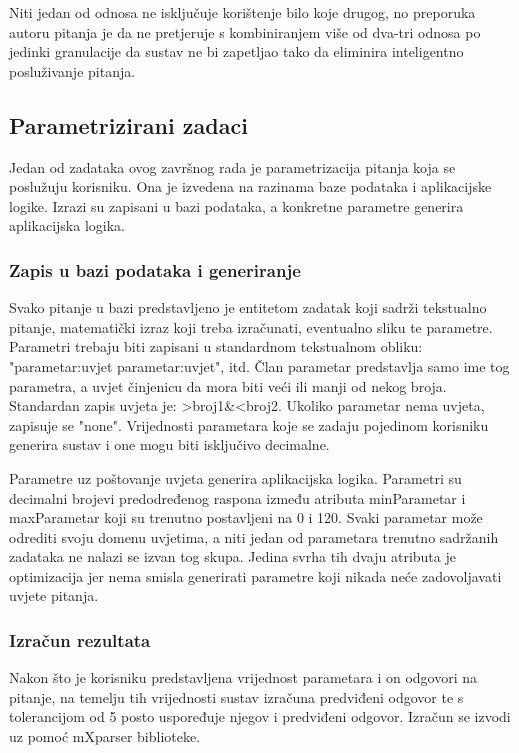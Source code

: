 \documentclass[times, utf8, zavrsni, numeric]{fer}
\begin{document}
Niti jedan od odnosa ne isključuje korištenje bilo koje drugog, no preporuka autoru pitanja je da ne pretjeruje s kombiniranjem više od dva-tri odnosa po jedinki granulacije da sustav ne bi zapetljao tako da eliminira inteligentno posluživanje pitanja.

\subsection{Parametrizirani zadaci}
Jedan od zadataka ovog završnog rada je parametrizacija pitanja koja se poslužuju korisniku. Ona je izvedena na razinama baze podataka i aplikacijske logike. Izrazi su zapisani u bazi podataka, a konkretne parametre generira aplikacijska logika.

\subsubsection{Zapis u bazi podataka i generiranje}
Svako pitanje u bazi predstavljeno je entitetom zadatak koji sadrži tekstualno pitanje, matematički izraz koji treba izračunati, eventualno sliku te parametre. Parametri trebaju biti zapisani u standardnom tekstualnom obliku: "parametar:uvjet parametar:uvjet", itd. Član parametar predstavlja samo ime tog parametra, a uvjet činjenicu da mora biti veći ili manji od nekog broja. Standardan zapis uvjeta je: >broj1\&<broj2. Ukoliko parametar nema uvjeta, zapisuje se "none". Vrijednosti parametara koje se zadaju pojedinom korisniku generira sustav i one mogu biti isključivo decimalne.
\par
Parametre uz poštovanje uvjeta generira aplikacijska logika. Parametri su decimalni brojevi predodređenog raspona između atributa minParametar i maxParametar koji su trenutno postavljeni na 0 i 120. Svaki parametar može odrediti svoju domenu uvjetima, a niti jedan od parametara trenutno sadržanih zadataka ne nalazi se izvan tog skupa. Jedina svrha tih dvaju atributa je optimizacija jer nema smisla generirati parametre koji nikada neće zadovoljavati uvjete pitanja.

\subsubsection{Izračun rezultata}
Nakon što je korisniku predstavljena vrijednost parametara i on odgovori na pitanje, na temelju tih vrijednosti sustav izračuna predviđeni odgovor te s tolerancijom od 5 posto uspoređuje njegov i predviđeni odgovor. Izračun se izvodi uz pomoć mXparser biblioteke.
\end{document}
